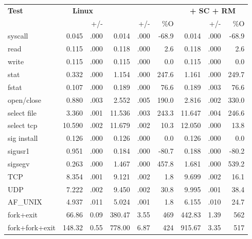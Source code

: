 \begin{table}[t!b!]
\footnotesize
\centering
\begin{tabular}{|l|rr|rrr|rrr|}
\hline
{\bf Test } & \multicolumn{2}{c|}{{\bf Linux}} & \multicolumn{3}{c|}{{\bf \graphene{}
}} & \multicolumn{3}{c|}{{\bf \graphene{} + SC + RM}} \\
&
\usec{} & +/- & 
\usec{} & +/- & \%O &
\usec{} & +/- & \%O \\

\hline

syscall        &  0.045 & .000 &  0.014 & .000 & -68.9 &    0.014 & .000 & -68.9   \\\hline
read           &  0.115 & .000 &  0.118 & .000 &   2.6 &    0.118 & .000 &   2.6   \\\hline
write          &  0.115 & .000 &  0.115 & .000 &   0.0 &    0.115 & .000 &   0.0   \\\hline
stat           &  0.332 & .000 &  1.154 & .000 & 247.6 &    1.161 & .000 & 249.7   \\\hline
fstat          &  0.107 & .000 &  0.189 & .000 &  76.6 &    0.189 & .003 &  76.6   \\\hline
open/close     &  0.880 & .003 &  2.552 & .005 & 190.0 &    2.816 & .002 & 330.0   \\\hline
select file    &  3.360 & .001 & 11.536 & .003 & 243.3 &   11.647 & .004 & 246.6   \\\hline
select tcp     & 10.590 & .002 & 11.679 & .002 &  10.3 &   12.050 & .000 &  13.8   \\\hline
sig install    &  0.126 & .000 &  0.126 & .000 &   0.0 &    0.126 & .000 &   0.0   \\\hline
sigusr1        &  0.951 & .000 &  0.184 & .000 & -80.7 &    0.188 & .000 & -80.2   \\\hline
sigsegv        &  0.263 & .000 &  1.467 & .000 & 457.8 &    1.681 & .000 & 539.2   \\\hline
\hline
TCP            &  8.354 & .001 &  9.121 & .002 &   1.8 &    9.699 & .002 &  16.1   \\\hline
UDP            &  7.222 & .002 &  9.450 & .002 &  30.8 &    9.995 & .001 &  38.4   \\\hline
AF\_UNIX       &  4.937 & .011 &  5.024 & .001 &   1.8 &    6.155 & .010 &  24.7   \\\hline
\hline
fork+exit      &  66.86 & 0.09 &   380.47 & 3.55 & 469 &   442.83 & 1.39 &   562   \\\hline
fork+fork+exit & 148.32 & 0.55 &   778.00 & 6.87 & 424 &   915.67 & 3.35 &   517   \\\hline

\end{tabular}
\end{table}
